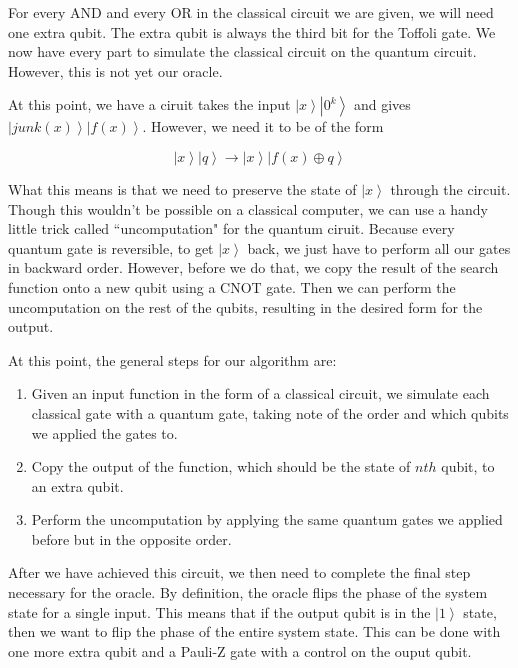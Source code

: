 \documentclass[11pt]{article}
\begin{document}
For every AND and every OR in the classical circuit we are given, we will need one extra qubit. The extra qubit is always the third bit for the Toffoli gate. We now have every part to simulate the classical circuit on the quantum circuit. However, this is not yet our oracle.

At this point, we have a ciruit takes the input $\left | x \right \rangle \left | 0^{k} \right \rangle$ and gives $\left | junk(x) \right \rangle \left | f(x) \right \rangle$. However, we need it to be of the form \cite{kothari12} 

$$\left | x \right \rangle \left | q \right \rangle \to \left | x \right \rangle \left | f(x) \oplus q \right \rangle$$

What this means is that we need to preserve the state of $\left | x \right \rangle$ through the circuit. Though this wouldn't be possible on a classical computer, we can use a handy little trick called ``uncomputation" for the quantum ciruit. Because every quantum gate is reversible, to get $\left | x \right \rangle$ back, we just have to perform all our gates in backward order. However, before we do that, we copy the result of the search function onto a new qubit using a CNOT gate. Then we can perform the uncomputation on the rest of the qubits, resulting in the desired form for the output.

At this point, the general steps for our algorithm are:

\begin{enumerate}
	\item Given an input function in the form of a classical circuit, we simulate each classical gate with a quantum gate, taking note of the order and which qubits we applied the gates to.
	\item Copy the output of the function, which should be the state of $nth$ qubit, to an extra qubit.
	\item Perform the uncomputation by applying the same quantum gates we applied before but in the opposite order. 
\end{enumerate}

After we have achieved this circuit, we then need to complete the final step necessary for the oracle. By definition, the oracle flips the phase of the system state for a single input. This means that if the output qubit is in the $\left | 1 \right \rangle$ state, then we want to flip the phase of the entire system state. This can be done with one more extra qubit and a Pauli-Z gate with a control on the ouput qubit.
\end{document}
